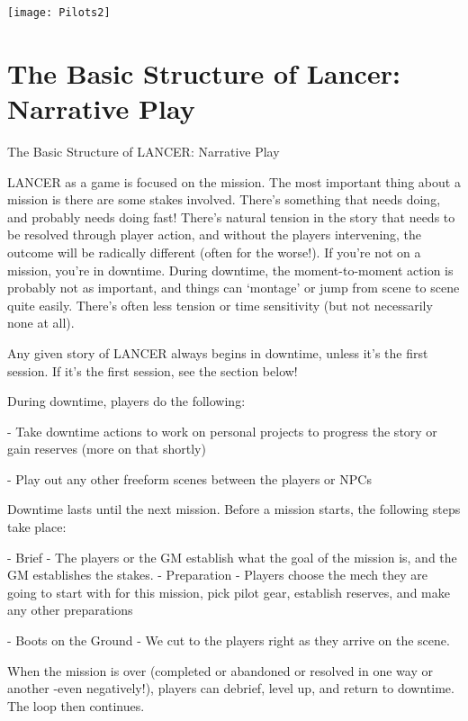 \begin{center}
  \texttt{[image: Pilots2]}
\end{center}

\chapter{The Basic Structure of Lancer: Narrative Play}

          The Basic Structure of LANCER:
                               Narrative Play

LANCER as a game is focused on the mission. The most important thing about a mission is
there are some stakes involved. There’s something that needs doing, and probably needs doing
fast! There’s natural tension in the story that needs to be resolved through player action, and
without the players intervening, the outcome will be radically different (often for the worse!). If
you’re not on a mission, you’re in downtime. During downtime, the moment-to-moment action is
probably not as important, and things can ‘montage’ or jump from scene to scene quite easily.
There’s often less tension or time sensitivity (but not necessarily none at all).

Any given story of LANCER always begins in downtime, unless it’s the first session. If it’s the first
session, see the section below!

During downtime, players do the following:

     -   Take downtime actions to work on personal projects to progress the story or gain
         reserves (more on that shortly)

     -   Play out any other freeform scenes between the players or NPCs

Downtime lasts until the next mission. Before a mission starts, the following steps take place:

         	- Brief - The players or the GM establish what the goal of the mission is, and the GM
         establishes the stakes.
         - Preparation - Players choose the mech they are going to start with for this mission,
         pick pilot gear, establish reserves, and make any other preparations

         	- Boots on the Ground - We cut to the players right as they arrive on the scene.

When the mission is over (completed or abandoned or resolved in one way or another -even
negatively!), players can debrief, level up, and return to downtime. The loop then continues.

